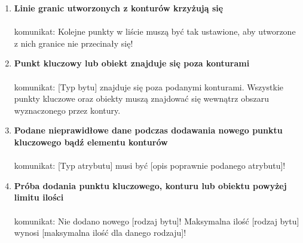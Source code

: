 \documentclass[hidelinks,10pt,a4paper]{article}
\begin{document}
\begin{enumerate}

\item \textbf{Linie granic utworzonych z konturów krzyżują się}
\\\\komunikat: Kolejne punkty w liście muszą być tak ustawione, aby utworzone z nich granice nie przecinały się!

\item \textbf{Punkt kluczowy lub obiekt znajduje się poza konturami}
\\\\komunikat: [Typ bytu] znajduje się poza podanymi konturami. Wszystkie punkty kluczowe oraz obiekty muszą znajdować się wewnątrz obszaru wyznaczonego przez kontury.

\item \textbf{Podane nieprawidłowe dane podczas dodawania nowego punktu kluczowego bądź elementu konturów}
\\\\komunikat: [Typ atrybutu] musi być [opis poprawnie podanego atrybutu]!

\item \textbf{Próba dodania punktu kluczowego, konturu lub obiektu powyżej limitu ilości}
\\\\komunikat: Nie dodano nowego [rodzaj bytu]! Maksymalna ilość [rodzaj bytu] wynosi [maksymalna ilość dla danego rodzaju]!

\end{enumerate}
\end{document}

